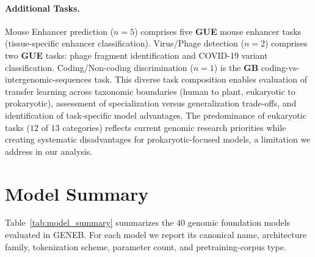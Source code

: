 \documentclass{article}
\theoremstyle{plain}
\theoremstyle{definition}
\theoremstyle{remark}
\begin{document}
\paragraph{Additional Tasks.} Mouse Enhancer prediction ($n=5$)
comprises five \textbf{GUE} mouse enhancer tasks (tissue-specific
enhancer classification). Virus/Phage detection ($n=2$) comprises
two \textbf{GUE} tasks: phage fragment identification and COVID-19 variant classification. Coding/Non-coding discrimination ($n=1$)
is the \textbf{GB} coding-vs-intergenomic-sequences task.
This diverse task composition enables evaluation of transfer
learning across taxonomic boundaries (human to plant, eukaryotic
to prokaryotic), assessment of specialization versus
generalization trade-offs, and identification of task-specific
model advantages. The predominance of eukaryotic tasks ($12$ of
$13$ categories) reflects current genomic research priorities
while creating systematic disadvantages for prokaryotic-focused
models, a limitation we address in our analysis.

\clearpage

\section{Model Summary}
\label{app:model_summary}

Table~\ref{tab:model_summary} summarizes the $40$ genomic foundation
models evaluated in GENEB. For each model we report its canonical
name, architecture family, tokenization scheme, parameter count, and
pretraining-corpus type.
\end{document}

